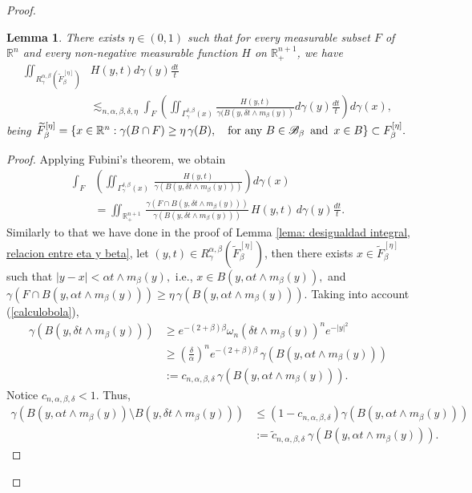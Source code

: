 \documentclass[leqno,11pt]{amsart}
\theoremstyle{plain}
\newtheorem{lemma}{Lemma}
\theoremstyle{remark}
\begin{document}
{\begin{proof}
\begin{lemma}\label{reversefubini1}
There exists $\eta\in (0,1)$ such that for every measurable subset $F$ of $\mathbb R^n$ and every non-negative measurable function $H$ on $\mathbb R^{n+1}_+$, we have
\begin{align}\label{reversefubini}
    \iint_{R^{\alpha,\beta}_\gamma\left(\widetilde{F}_{\beta}^{[\eta]}\right)} & H(y,t) d\gamma(y) \frac{dt}{t}\nonumber \\
    & \lesssim_{n,\alpha, \beta, \delta, \eta} \int_F \left(\iint_{\Gamma_\gamma^{\delta, \beta}(x)} \frac{H(y,t)}{\gamma(B(y,\delta t\wedge m_\beta(y))} d\gamma(y) \frac{dt}{t}\right) d\gamma(x),
\end{align}
being $\widetilde{F}^{[\eta]}_\beta=\{x\in \mathbb{R}^n: \gamma(B\cap F)\ge \eta\, \gamma(B),\ \ \hbox{ for any } B\in \mathscr{B}_\beta\ \, \text{and}\ \, x\in B\}\subset F_\beta^{[\eta]}.$
\end{lemma}
\begin{proof}
Applying Fubini's theorem, we obtain
\begin{align*}
\int_F & \left(\iint_{\Gamma_\gamma^{\delta, \beta}(x)}\, \frac{H(y,t)}{\gamma(B(y,\delta t \wedge m_\beta (y)))}\right) d\gamma(x) \\& =\iint_{\mathbb{R}^{n+1}_+}\, \frac{\gamma(F\cap B(y, \delta t \wedge m_\beta (y)))}{\gamma(B(y, \delta t \wedge m_\beta (y)))}\, H(y,t)\, d\gamma(y)\frac{dt}{t}.
\end{align*}
Similarly to that we have done in the proof of Lemma \ref{lema: desigualdad integral, relacion entre eta y beta}, let $(y,t)\in R_\gamma^{\alpha, \beta}\left(\widetilde{F}^{[\eta]}_\beta\right)$, then there exists $x\in \widetilde{F}_\beta^{[\eta]}$ such that $|y-x|<\alpha t\wedge m_\beta(y),$ i.e., $x\in B(y,\alpha t\wedge m_\beta (y)),$ and $\gamma(F\cap B(y, \alpha t\wedge m_\beta (y)))\ge \eta \, \gamma(B(y, \alpha t\wedge m_\beta(y))).$  Taking into account (\ref{calculobola}),
\begin{align*}
\gamma(B(y, \delta t\wedge m_\beta(y))) &\ge e^{-(2+\beta)\beta} \omega_n (\delta t\wedge m_\beta(y))^n e^{-|y|^2}\\ & \ge \left(\frac{\delta}{\alpha}\right)^n e^{-(2+\beta)\beta} \, \gamma(B(y, \alpha t\wedge m_\beta (y)))\\
& := c_{n, \alpha, \beta, \delta}\, \gamma(B(y, \alpha t\wedge m_\beta(y))).
\end{align*}
Notice $c_{n, \alpha, \beta, \delta}<1.$
Thus, \begin{align*}\gamma(B(y, \alpha t\wedge m_\beta (y))\setminus B(y,\delta t\wedge m_\beta (y)))&\le (1-c_{n, \alpha, \beta, \delta})\gamma (B(y, \alpha t\wedge m_\beta (y)))\\ &  :=\widetilde{c}_{n, \alpha,\beta, \delta}\  \gamma(B(y,\alpha t\wedge m_\beta (y))).

\end{align*}
\end{proof}
\end{proof}}
\end{document}
